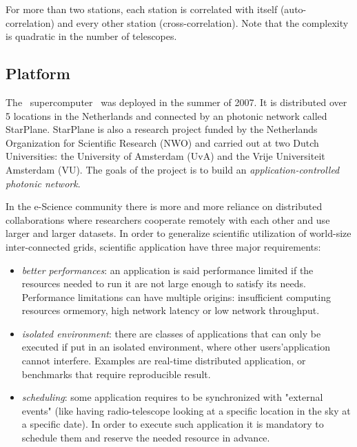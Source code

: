 For more than two stations, each station is correlated with itself
(auto-correlation) and every other station (cross-correlation). Note
that the complexity is quadratic in the number of telescopes.

\subsection{Platform}\label{sec:chap1}
The \ supercomputer~\cite{das3} was deployed in the summer of
2007. It is distributed over 5 locations in the Netherlands and
connected by an photonic network called StarPlane. StarPlane is also a
research project funded by the Netherlands Organization for Scientific
Research (NWO) and carried out at two Dutch Universities: the
University of Amsterdam (UvA) and the Vrije Universiteit Amsterdam
(VU). The goals of the project is to build an
\textit{application-controlled photonic network}. 

In the e-Science community there is more and more reliance on
distributed collaborations where researchers cooperate remotely with
each other and use larger and larger datasets. In order to generalize
scientific utilization of world-size inter-connected grids, scientific
application have three major requirements:
\begin{itemize}
\item \emph{better performances}: an application is said performance
  limited if the resources needed to run it are not large enough to
  satisfy its needs. Performance limitations can have multiple
  origins: insufficient computing resources ormemory, high network
  latency or low network throughput.
  
\item \emph{isolated environment}: there are classes of applications
  that can only be executed if put in an isolated environment, where
  other users'application cannot interfere. Examples are real-time
  distributed application, or benchmarks that require reproducible
  result.

\item \emph{scheduling}: some application requires to be synchronized
  with "external events" (like having radio-telescope looking at a
  specific location in the sky at a specific date). In order to
  execute such application it is mandatory to schedule them and
  reserve the needed resource in advance.
\end{itemize}


